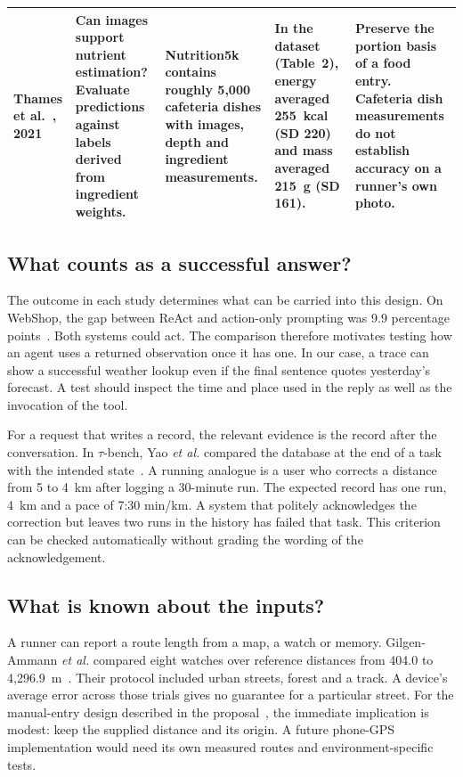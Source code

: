 \documentclass[conference]{IEEEtran}
\begin{document}
\begin{table}[t]
\begin{tabularx}{\textwidth}{@{}p{2.10cm}YYYY@{}}
Thames et al.~\cite{nutri}, 2021 & Can images support nutrient estimation? Evaluate predictions against labels derived from ingredient weights. & Nutrition5k contains roughly 5,000 cafeteria dishes with images, depth and ingredient measurements. & In the dataset (Table~2), energy averaged 255~kcal (SD 220) and mass averaged 215~g (SD 161). & Preserve the portion basis of a food entry. Cafeteria dish measurements do not establish accuracy on a runner's own photo.\\\bottomrule
\end{tabularx}
\end{table}


\subsection{What counts as a successful answer?}
The outcome in each study determines what can be carried into this design. On WebShop, the gap between ReAct and action-only prompting was 9.9 percentage points~\cite{react}. Both systems could act. The comparison therefore motivates testing how an agent uses a returned observation once it has one. In our case, a trace can show a successful weather lookup even if the final sentence quotes yesterday's forecast. A test should inspect the time and place used in the reply as well as the invocation of the tool.

For a request that writes a record, the relevant evidence is the record after the conversation. In $\tau$-bench, Yao \emph{et al.} compared the database at the end of a task with the intended state~\cite{tau}. A running analogue is a user who corrects a distance from 5 to 4~km after logging a 30-minute run. The expected record has one run, 4~km and a pace of 7:30 min/km. A system that politely acknowledges the correction but leaves two runs in the history has failed that task. This criterion can be checked automatically without grading the wording of the acknowledgement.

\subsection{What is known about the inputs?}
A runner can report a route length from a map, a watch or memory. Gilgen-Ammann \emph{et al.} compared eight watches over reference distances from 404.0 to 4,296.9~m~\cite{gnss}. Their protocol included urban streets, forest and a track. A device's average error across those trials gives no guarantee for a particular street. For the manual-entry design described in the proposal~\cite{proposal}, the immediate implication is modest: keep the supplied distance and its origin. A future phone-GPS implementation would need its own measured routes and environment-specific tests.
\end{document}

